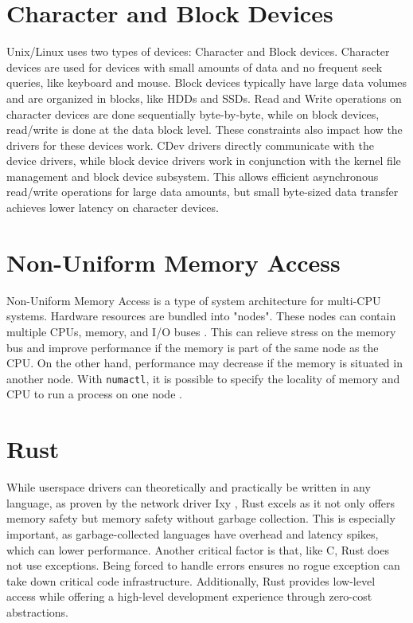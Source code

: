 \section{Character and Block Devices}
Unix/Linux uses two types of devices: Character and Block devices. Character devices are used for devices with small amounts of data and no frequent seek queries, like keyboard and mouse.
Block devices typically have large data volumes and are organized in blocks, like HDDs and SSDs.
Read and Write operations on character devices are done sequentially byte-by-byte, while on block devices, read/write is done at the data block level.
These constraints also impact how the drivers for these devices work. CDev drivers directly communicate with the device drivers, while block device drivers work in conjunction with the kernel file management and block device subsystem. This allows efficient asynchronous read/write operations for large data amounts, but small byte-sized data transfer achieves lower latency on character devices.

\section{Non-Uniform Memory Access}
Non-Uniform Memory Access is a type of system architecture for multi-CPU systems. Hardware resources are bundled into "nodes". These nodes can contain multiple CPUs, memory, and I/O buses \cite{numakerneldocs}. This can relieve stress on the memory bus and improve performance if the memory is part of the same node as the CPU. On the other hand, performance may decrease if the memory is situated in another node. With \texttt{numactl}, it is possible to specify the locality of memory and CPU to run a process on one node \cite{numactlmanpage}.

\section{Rust}
While userspace drivers can theoretically and practically be written in any language, as proven by the network driver Ixy \cite{ixylanggithub}, Rust excels as it not only offers memory safety but memory safety without garbage collection. This is especially important, as garbage-collected languages have overhead and latency spikes, which can lower performance. Another critical factor is that, like C, Rust does not use exceptions. Being forced to handle errors ensures no rogue exception can take down critical code infrastructure.
Additionally, Rust provides low-level access while offering a high-level development experience through zero-cost abstractions.